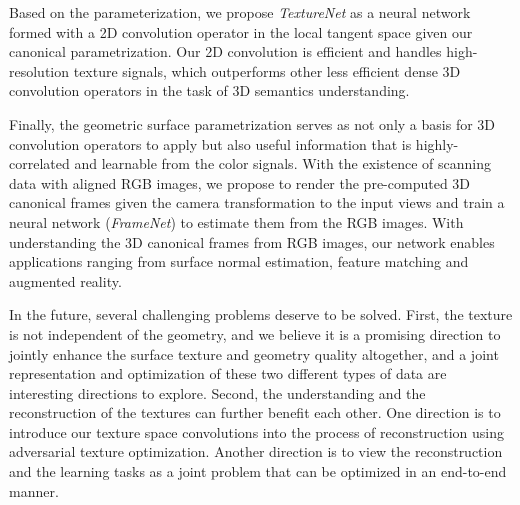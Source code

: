 Based on the parameterization, we propose \emph{TextureNet} as a neural network formed with a 2D convolution operator in the local tangent space given our canonical parametrization.
%
Our 2D convolution is efficient and handles high-resolution texture signals, which outperforms other less efficient dense 3D convolution operators in the task of 3D semantics understanding.

Finally, the geometric surface parametrization serves as not only a basis for 3D convolution operators to apply but also useful information that is highly-correlated and learnable from the color signals. With the existence of scanning data with aligned RGB images, we propose to render the pre-computed 3D canonical frames given the camera transformation to the input views and train a neural network (\emph{FrameNet}) to estimate them from the RGB images. With understanding the 3D canonical frames from RGB images, our network enables applications ranging from surface normal estimation, feature matching and augmented reality. 

In the future, several challenging problems deserve to be solved. First, the texture is not independent of the geometry, and we believe it is a promising direction to jointly enhance the surface texture and geometry quality altogether, and a joint representation and optimization of these two different types of data are interesting directions to explore. Second, the understanding and the reconstruction of the textures can further benefit each other. One direction is to introduce our texture space convolutions into the process of reconstruction using adversarial texture optimization. Another direction is to view the reconstruction and the learning tasks as a joint problem that can be optimized in an end-to-end manner.